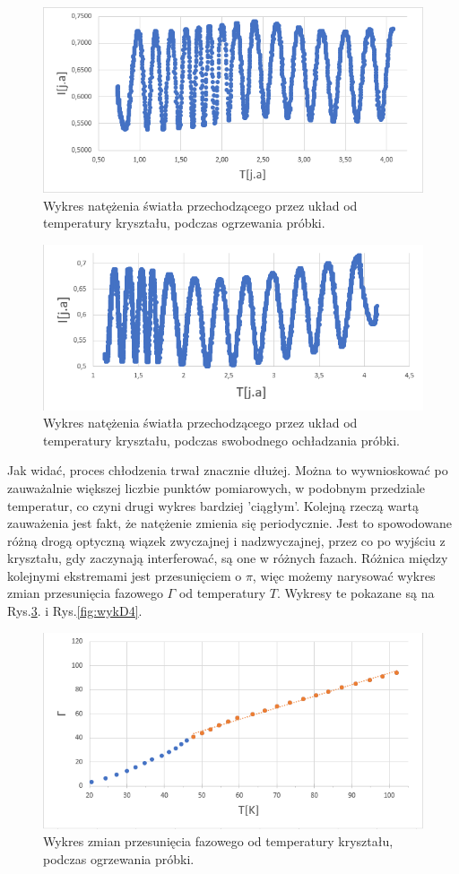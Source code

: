 \documentclass{article}
\begin{document}
\begin{figure}[!h]
	\centering
	\includegraphics[width=0.7\linewidth]{wykD1.png}
	\caption{Wykres natężenia światła przechodzącego przez układ od temperatury kryształu, podczas ogrzewania próbki.}
	\label{fig:wykD1}
\end{figure}

\begin{figure}[!h]
	\centering
	\includegraphics[width=0.7\linewidth]{wykD2.png}
	\caption{Wykres natężenia światła przechodzącego przez układ od temperatury kryształu, podczas swobodnego ochładzania próbki.}
	\label{fig:wykD2}
\end{figure}

Jak widać, proces chłodzenia trwał znacznie dłużej. Można to wywnioskować po zauważalnie większej liczbie punktów pomiarowych, w podobnym przedziale temperatur, co czyni drugi wykres bardziej 'ciągłym'. Kolejną rzeczą wartą zauważenia jest fakt, że natężenie zmienia się periodycznie. Jest to spowodowane różną drogą optyczną wiązek zwyczajnej i nadzwyczajnej, przez co po wyjściu z kryształu, gdy zaczynają interferować, są one w różnych fazach. Różnica między kolejnymi ekstremami jest przesunięciem o $\pi$, więc możemy narysować wykres zmian przesunięcia fazowego $\Gamma$ od temperatury $T$. Wykresy te pokazane są na Rys.\ref{fig:wykD3}. i Rys.\ref{fig:wykD4}.

\begin{figure}[!h]
	\centering
	\includegraphics[width=0.7\linewidth]{wykD3.png}
	\caption{Wykres zmian przesunięcia fazowego od temperatury kryształu, podczas ogrzewania próbki.}
	\label{fig:wykD3}
\end{figure}
\end{document}
